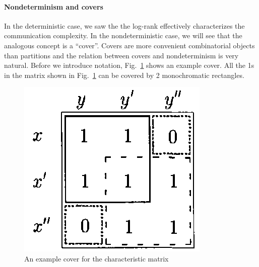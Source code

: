 \documentclass[usletter]{article}
\begin{document}
\paragraph{Nondeterminism and covers}
In the deterministic case, we saw the the log-rank effectively characterizes the communication complexity. In the nondeterministic case, we will see that the analogous concept is a ``cover''. Covers are more convenient combinatorial objects than partitions and the relation between covers and nondeterminism is very natural. Before we introduce notation, Fig.~\ref{fig:cover_example} shows an example cover. All the 1s in the matrix shown in Fig.~\ref{fig:cover_example} can be covered by 2 monochromatic rectangles.
\begin{figure}
\centering
\includegraphics[width=0.3 \textwidth]{cover_example}
\caption{An example cover for the characteristic matrix}
\label{fig:cover_example}
\end{figure}




\end{document}

